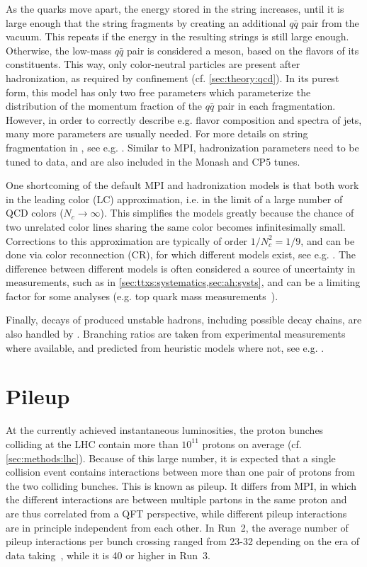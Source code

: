 As the quarks move apart, the energy stored in the string increases, until it is large enough that the string fragments by creating an additional $q\bar{q}$ pair from the vacuum. This repeats if the energy in the resulting strings is still large enough. Otherwise, the low-mass $q\bar{q}$ pair is considered a meson, based on the flavors of its constituents. This way, only color-neutral particles are present after hadronization, as required by confinement (cf. \cref{sec:theory:qcd}). In its purest form, this model has only two free parameters which parameterize the distribution of the momentum fraction of the $q\bar{q}$ pair in each fragmentation. However, in order to correctly describe e.g. flavor composition and \pt spectra of jets, many more parameters are usually needed. For more details on string fragmentation in \pythia, see e.g. . Similar to MPI, hadronization parameters need to be tuned to data, and are also included in the Monash and CP5 tunes.

One shortcoming of the default MPI and hadronization models is that both work in the leading color (LC) approximation, i.e. in the limit of a large number of QCD colors ($N_c \rightarrow \infty$). This simplifies the models greatly because the chance of two unrelated color lines sharing the same color becomes infinitesimally small. Corrections to this approximation are typically of order $1/N_c^2 = 1/9$, and can be done via color reconnection (CR), for which different models exist, see e.g. . The difference between different models is often considered a source of uncertainty in measurements, such as in \cref{sec:ttxs:systematics,sec:ah:systs}, and can be a limiting factor for some analyses (e.g. top quark mass measurements~\cite{CMS:TOP-20-008,ATLAS:2025bpp}).

Finally, decays of produced unstable hadrons, including possible decay chains, are also handled by \pythia. Branching ratios are taken from experimental measurements where available, and predicted from heuristic models where not, see e.g. .

\section{Pileup}
\label{sec:mc:pileup}

At the currently achieved instantaneous luminosities, the proton bunches colliding at the LHC contain more than $10^{11}$ protons on average (cf. \cref{sec:methods:lhc}). Because of this large number, it is expected that a single collision event contains interactions between more than one pair of protons from the two colliding bunches. This is known as pileup. It differs from MPI, in which the different interactions are between multiple partons in the same proton and are thus correlated from a QFT perspective, while different pileup interactions are in principle independent from each other. In Run~2, the average number of pileup interactions per bunch crossing ranged from 23-32 depending on the era of data taking~\cite{CMS:2020ebo}, while it is 40 or higher in Run~3.

